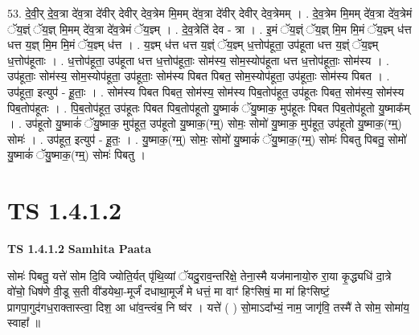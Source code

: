 \documentclass[17pt]{extarticle}
\begin{document}
53. दे॒वी॒र् दे॒व॒त्रा दे॑व॒त्रा दे॑वीर् देवीर् देव॒त्रेम मि॒मम् दे॑व॒त्रा दे॑वीर् देवीर् देव॒त्रेमम् । . दे॒व॒त्रेम मि॒मम् दे॑व॒त्रा दे॑व॒त्रेमं ॅय॒ज्ञ्ं ॅय॒ज्ञ् मि॒मम् दे॑व॒त्रा दे॑व॒त्रेमं ॅय॒ज्ञ्म् । . दे॒व॒त्रेति॑ देव - त्रा । . इ॒मं ॅय॒ज्ञ्ं ॅय॒ज्ञ् मि॒म मि॒मं ॅय॒ज्ञ्म् ध॑त्त धत्त य॒ज्ञ् मि॒म मि॒मं ॅय॒ज्ञ्म् ध॑त्त । . य॒ज्ञ्म् ध॑त्त धत्त य॒ज्ञ्ं ॅय॒ज्ञ्म् ध॒त्तोप॑हूता॒ उप॑हूता धत्त य॒ज्ञ्ं ॅय॒ज्ञ्म् ध॒त्तोप॑हूताः । . ध॒त्तोप॑हूता॒ उप॑हूता धत्त ध॒त्तोप॑हूताः॒ सोम॑स्य॒ सोम॒स्योप॑हूता धत्त ध॒त्तोप॑हूताः॒ सोम॑स्य । . उप॑हूताः॒ सोम॑स्य॒ सोम॒स्योप॑हूता॒ उप॑हूताः॒ सोम॑स्य पिबत पिबत॒ सोम॒स्योप॑हूता॒ उप॑हूताः॒ सोम॑स्य पिबत । . उप॑हूता॒ इत्युप॑ - हू॒ताः॒ । . सोम॑स्य पिबत पिबत॒ सोम॑स्य॒ सोम॑स्य पिब॒तोप॑हूत॒ उप॑हूतः पिबत॒ सोम॑स्य॒ सोम॑स्य पिब॒तोप॑हूतः । . पि॒ब॒तोप॑हूत॒ उप॑हूतः पिबत पिब॒तोप॑हूतो यु॒ष्माकं॑ ॅयु॒ष्माक॒ मुप॑हूतः पिबत पिब॒तोप॑हूतो यु॒ष्माक᳚म् । . उप॑हूतो यु॒ष्माकं॑ ॅयु॒ष्माक॒ मुप॑हूत॒ उप॑हूतो यु॒ष्माक॒(ग्म्॒) सोमः॒ सोमो॑ यु॒ष्माक॒ मुप॑हूत॒ उप॑हूतो यु॒ष्माक॒(ग्म्॒) सोमः॑ । . उप॑हूत॒ इत्युप॑ - हू॒तः॒ । . यु॒ष्माक॒(ग्म्॒) सोमः॒ सोमो॑ यु॒ष्माकं॑ ॅयु॒ष्माक॒(ग्म्॒) सोमः॑ पिबतु पिबतु॒ सोमो॑ यु॒ष्माकं॑ ॅयु॒ष्माक॒(ग्म्॒) सोमः॑ पिबतु । \newline
\pagebreak
{}

\section{ TS 1.4.1.2 }

\textbf{TS 1.4.1.2 } \newline
\textbf{Samhita Paata} \newline

सोमः॑ पिबतु॒ यत्ते॑ सोम दि॒वि ज्योति॒र्यत् पृ॑थि॒व्यां ॅयदु॒राव॒न्तरि॑क्षे॒ तेना॒स्मै यज॑मानायो॒रु रा॒या कृ॒द्ध्यधि॑ दा॒त्रे वो॑चो॒ धिष॑णे वी॒डू स॒ती वी॑डयेथा॒-मूर्जं॑ दधाथा॒मूर्जं॑ मे धत्तं॒ मा वाꣳ॑ हिꣳसिषं॒ मा मा॑ हिꣳसिष्टं॒ प्रागपा॒गुद॑गध॒राक्तास्त्वा॒ दिश॒ आ धा॑व॒न्त्वंब॒ नि ष्व॑र । यत्ते॑ ( ) सो॒माऽदा᳚भ्यं॒ नाम॒ जागृ॑वि॒ तस्मै॑ ते सोम॒ सोमा॑य॒ स्वाहा᳚ ॥ \newline
\end{document}
